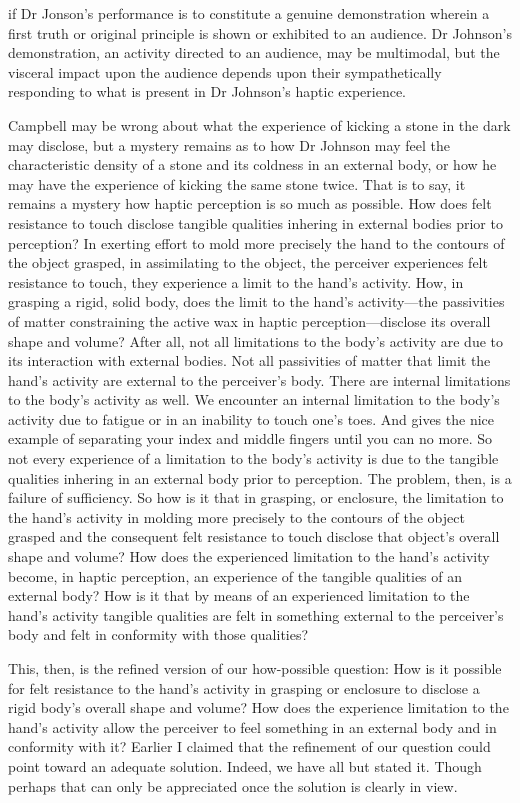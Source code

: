 if Dr Jonson's performance is to constitute a genuine demonstration wherein a first truth or original principle is shown or exhibited to an audience. Dr Johnson's demonstration, an activity directed to an audience, may be multimodal, but the visceral impact upon the audience depends upon their sympathetically responding to what is present in Dr Johnson's haptic experience.

Campbell may be wrong about what the experience of kicking a stone in the dark may disclose, but a mystery remains as to how Dr Johnson may feel the characteristic density of a stone and its coldness in an external body, or how he may have the experience of kicking the same stone twice. That is to say, it remains a mystery how haptic perception is so much as possible. How does felt resistance to touch disclose tangible qualities inhering in external bodies prior to perception? In exerting effort to mold more precisely the hand to the contours of the object grasped, in assimilating to the object, the perceiver experiences felt resistance to touch, they experience a limit to the hand's activity. How, in grasping a rigid, solid body, does the limit to the hand's activity---the passivities of matter constraining the active wax in haptic perception---disclose its overall shape and volume? After all, not all limitations to the body's activity are due to its interaction with external bodies. Not all passivities of matter that limit the hand's activity are external to the perceiver's body. There are internal limitations to the body's activity as well. We encounter an internal limitation to the body's activity due to fatigue or in an inability to touch one's toes. And \citet[154]{Smith:2002sa} gives the nice example of separating your index and middle fingers until you can no more. So not every experience of a limitation to the body's activity is due to the tangible qualities inhering in an external body prior to perception. The problem, then, is a failure of sufficiency. So how is it that in grasping, or enclosure, the limitation to the hand's activity in molding more precisely to the contours of the object grasped and the consequent felt resistance to touch disclose that object's overall shape and volume? How does the experienced limitation to the hand's activity become, in haptic perception, an experience of the tangible qualities of an external body? How is it that by means of an experienced limitation to the hand's activity tangible qualities are felt in something external to the perceiver's body and felt in conformity with those qualities?

This, then, is the refined version of our how-possible question: How is it possible for felt resistance to the hand's activity in grasping or enclosure to disclose a rigid body's overall shape and volume? How does the experience limitation to the hand's activity allow the perceiver to feel something in an external body and in conformity with it? Earlier I claimed that the refinement of our question could point toward an adequate solution. Indeed, we have all but stated it. Though perhaps that can only be appreciated once the solution is clearly in view.


